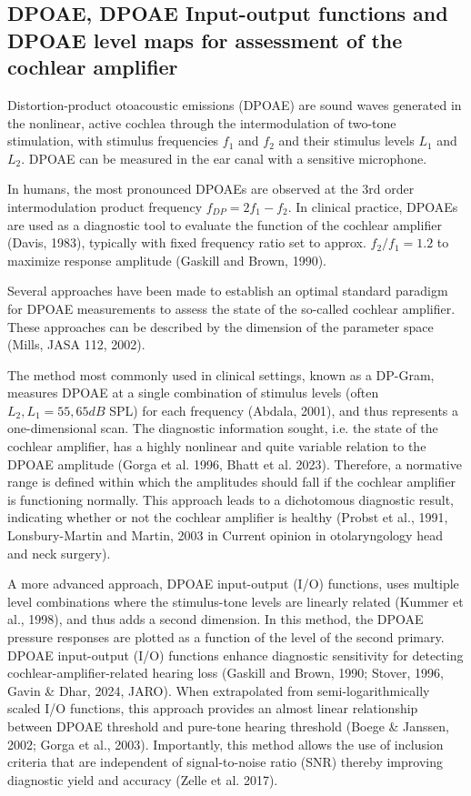 \documentclass[journal,twoside,web]{ieeecolor2}
\begin{document}
\subsection{DPOAE, DPOAE Input-output functions and DPOAE level maps for assessment of the cochlear amplifier}
Distortion-product otoacoustic emissions (DPOAE) are sound waves generated in the nonlinear, active cochlea through the intermodulation of two-tone stimulation, with stimulus frequencies $f_1$ and $f_2$ and their stimulus levels $L_1$ and $L_2$.
DPOAE can be measured in the ear canal with a sensitive microphone.

In humans, the most pronounced DPOAEs are observed at the 3rd order intermodulation product frequency $f_{DP} = 2f_1 - f_2$.
In clinical practice, DPOAEs are used as a diagnostic tool to evaluate the function of the cochlear amplifier (Davis, 1983), typically with fixed frequency ratio set to approx. $f_2 / f_1 = 1.2$ to maximize response amplitude (Gaskill and Brown, 1990).

Several approaches have been made to establish an optimal standard paradigm for DPOAE measurements to assess the state of the so-called cochlear amplifier.
These approaches can be described by the dimension of the parameter space (Mills, JASA 112, 2002).

The method most commonly used in clinical settings, known as a DP-Gram, measures DPOAE at a single combination of stimulus levels (often $L_2, L_1 = 55, 65 dB$ SPL) for each frequency (Abdala, 2001), and thus represents a one-dimensional scan.
The diagnostic information sought, i.e. the state of the cochlear amplifier, has a highly nonlinear and quite variable relation to the DPOAE amplitude (Gorga et al. 1996, Bhatt et al. 2023).
Therefore, a normative range is defined within which the amplitudes should fall if the cochlear amplifier is functioning normally.
This approach leads to a dichotomous diagnostic result, indicating whether or not the cochlear amplifier is healthy (Probst et al., 1991, Lonsbury-Martin and Martin, 2003 in Current opinion in otolaryngology head and neck surgery).
 
A more advanced approach, DPOAE input-output (I/O) functions, uses multiple level combinations where the stimulus-tone levels are linearly related (Kummer et al., 1998), and thus adds a second dimension.
In this method, the DPOAE pressure responses are plotted as a function of the level of the second primary.
DPOAE input-output (I/O) functions enhance diagnostic sensitivity for detecting cochlear-amplifier-related hearing loss (Gaskill and Brown, 1990; Stover, 1996, Gavin \& Dhar, 2024, JARO).
When extrapolated from semi-logarithmically scaled I/O functions, this approach provides an almost linear relationship between DPOAE threshold and pure-tone hearing threshold (Boege \& Janssen, 2002; Gorga et al., 2003).
Importantly, this method allows the use of inclusion criteria that are independent of signal-to-noise ratio (SNR) thereby improving diagnostic yield and accuracy (Zelle et al. 2017).
\end{document}
